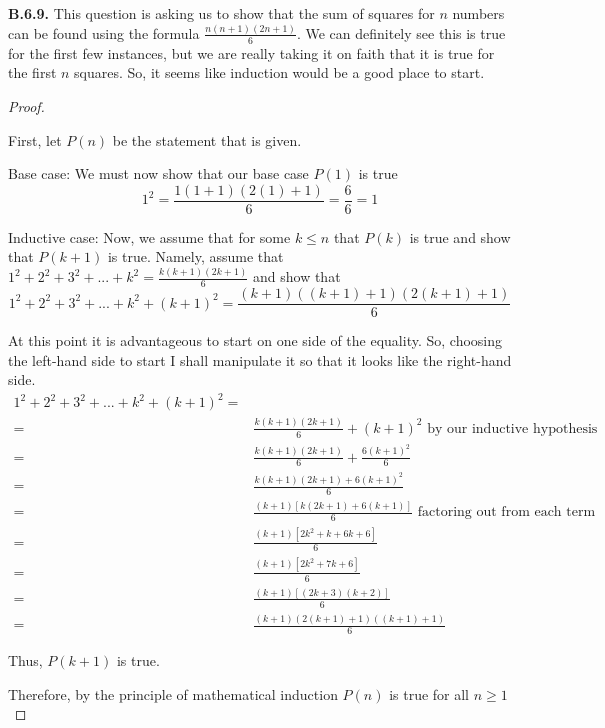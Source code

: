\documentclass[10pt,]{book}
\theoremstyle{plain}
\theoremstyle{definition}
\theoremstyle{definition}
\theoremstyle{definition}
\theoremstyle{definition}
\numberwithin{equation}{chapter}
\newcommand{\amp}{&}
\begin{document}
\par\smallskip
\noindent\textbf{B.6.9.} \hypertarget{p-2292}{}%
This question is asking us to show that the sum of squares for \(n\) numbers can be found using the formula \(\frac{n(n+1)(2n+1)}{6}\). We can definitely see this is true for the first few instances, but we are really taking it on faith that it is true for the first \(n\) squares. So, it seems like induction would be a good place to start.%
\begin{proof}\hypertarget{proof-48}{}
\hypertarget{p-2293}{}%
First, let \(P(n)\) be the statement that is given.%
\par
\hypertarget{p-2294}{}%
Base case: We must now show that our base case \(P(1)\) is true%
\begin{equation*}
1^2 = \frac{1(1+1)(2(1)+1)}{6} = \frac{6}{6} =1
\end{equation*}
%
\par
\hypertarget{p-2295}{}%
Inductive case: Now, we assume that for some \(k\leq n\) that \(P(k)\) is true and show that \(P(k+1)\) is true. Namely, assume that \(1^2 +2^2 +3^2+...+k^2 = \frac{k(k+1)(2k+1)}{6}\) and show that%
\begin{equation*}
1^2 +2^2 +3^2+...+k^2+{(k+1)}^2 = \frac{(k+1)((k+1)+1)(2(k+1)+1)}{6}
\end{equation*}
%
\par
\hypertarget{p-2296}{}%
At this point it is advantageous to start on one side of the equality. So, choosing the left-hand side to start I shall manipulate it so that it looks like the right-hand side.%
\begin{align*}
1^2 +2^2 +3^2+...+k^2+{(k+1)}^2 =\\
= \amp \frac{k(k+1)(2k+1)}{6} +(k+1)^2 \mbox{ by our inductive hypothesis}\\
= \amp \frac{k(k+1)(2k+1)}{6} +\frac{6(k+1)^2}{6}\\
= \amp \frac{k(k+1)(2k+1)+6(k+1)^2}{6}\\
= \amp \frac{(k+1)[k(2k+1)+6(k+1)]}{6} \mbox{ factoring out  from each term}\\
= \amp \frac{(k+1)[2k^2+k+6k+6]}{6}\\
= \amp \frac{(k+1)[2k^2+7k+6]}{6}\\
= \amp \frac{(k+1)[(2k+3)(k+2)]}{6}\\
= \amp \frac{(k+1)(2(k+1)+1)((k+1)+1)}{6}
\end{align*}
%
\par
\hypertarget{p-2297}{}%
Thus, \(P(k+1)\) is true.%
\par
\hypertarget{p-2298}{}%
Therefore, by the principle of mathematical induction \(P(n)\) is true for all \(n \geq 1\)%
\end{proof}
\end{document}
